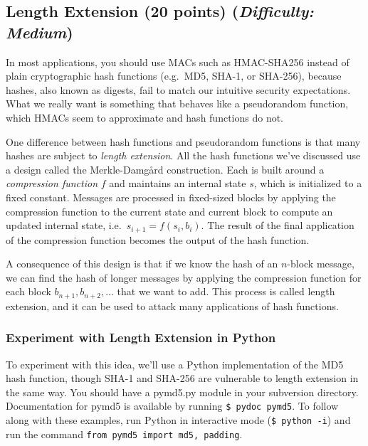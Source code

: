 \documentclass[letterpaper,12pt]{report}
\begin{document}
\subsection{Length Extension (20 points)  \hfill\rm\normalsize (\emph{Difficulty: Medium})}
\label{sec:md5_length_extension}
In most applications, you should use MACs such as HMAC-SHA256 instead of plain cryptographic hash functions (e.g.\ MD5, SHA-1, or SHA-256), because hashes, also known as digests, fail to match our intuitive security expectations.  What we really want is something that behaves like a pseudorandom function, which HMACs seem to approximate and hash functions do not.
 
\medskip
 
One difference between hash functions and pseudorandom functions is that many hashes are subject to \emph{length extension}.  All the hash functions we've discussed use a design called the Merkle-Damg\r{a}rd  construction.  Each is built around a \emph{compression function} $f$ and maintains an internal state $s$, which is initialized to a fixed constant.  Messages are processed in fixed-sized blocks by applying the compression function to the current state and current block to compute an updated internal state, i.e.~$s_{i+1} =  f(s_i, b_i)$.  The result of the final application of the compression function becomes the output of the hash function.

\medskip
 
A consequence of this design is that if we know the hash of an $n$-block message, we can find the hash of longer messages by applying the compression function for each block $b_{n+1}, b_{n+2}, \ldots$ that we want to add.  This process is called length extension, and it can be used to attack many applications of hash functions.
 
\subsubsection{Experiment with Length Extension in Python}

To experiment with this idea, we'll use a Python implementation of the MD5 hash function, though SHA-1 and SHA-256 are vulnerable to length extension in the same way.  You should have a pymd5.py module in your subversion directory. Documentation for pymd5 is available by running \texttt{\$ pydoc pymd5}.  To follow along with these examples, run Python in interactive mode (\texttt{\$ python -i}) and run the command \texttt{from pymd5 import md5, padding}.
  
\end{document}
